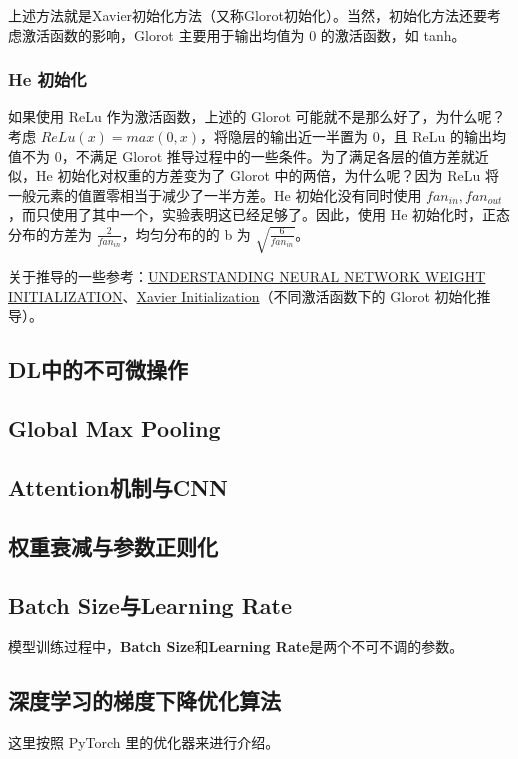 上述方法就是Xavier初始化方法（又称Glorot初始化）。当然，初始化方法还要考虑激活函数的影响，Glorot 主要用于输出均值为 0 的激活函数，如 tanh。

\subsubsection{He 初始化}
如果使用 ReLu 作为激活函数，上述的 Glorot 可能就不是那么好了，为什么呢？考虑 $ReLu(x) = max(0, x)$，将隐层的输出近一半置为 0，且 ReLu 的输出均值不为 0，不满足 Glorot 推导过程中的一些条件。为了满足各层的值方差就近似，He 初始化对权重的方差变为了 Glorot 中的两倍，为什么呢？因为 ReLu 将一般元素的值置零相当于减少了一半方差。He 初始化没有同时使用 $fan_{in}, fan_{out}$，而只使用了其中一个，实验表明这已经足够了。因此，使用 He 初始化时，正态分布的方差为 $\frac{2}{fan_{in}}$，均匀分布的的 b 为 $\sqrt{\frac{6}{fan_{in}}}$。

关于推导的一些参考：\href{https://intoli.com/blog/neural-network-initialization/}{UNDERSTANDING NEURAL NETWORK WEIGHT INITIALIZATION}、\href{https://mnsgrg.com/2017/12/21/xavier-initialization/}{Xavier Initialization}（不同激活函数下的 Glorot 初始化推导）。



\subsection{DL中的不可微操作}

\subsection{Global Max Pooling}

\subsection{Attention机制与CNN}

\subsection{权重衰减与参数正则化}

\subsection{Batch Size与Learning Rate}
模型训练过程中，\textbf{Batch Size}和\textbf{Learning Rate}是两个不可不调的参数。


\subsection{深度学习的梯度下降优化算法}
这里按照 PyTorch 里的优化器来进行介绍。
